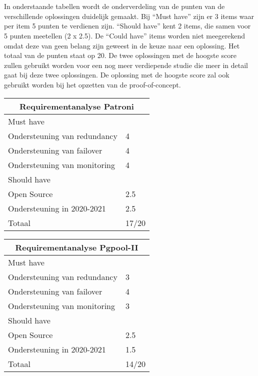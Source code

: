\section{}
\label{sec:Resultatenanalyse}

\subsection{}
\label{subsec:Resultaten requirements}

In onderstaande tabellen wordt de onderverdeling van de punten van de verschillende oplossingen duidelijk gemaakt. Bij “Must have” zijn er 3 items waar per item 5 punten te verdienen zijn. “Should have” kent 2 items, die samen voor 5 punten meetellen (2 x 2.5). De “Could have” items worden niet meegerekend omdat deze van geen belang zijn geweest in de keuze naar een oplossing. Het totaal van de punten staat op 20. De twee oplossingen met de hoogste score zullen gebruikt worden voor een nog meer verdiepende studie die meer in detail gaat bij deze twee oplossingen. De oplossing met de hoogste score zal ook gebruikt worden bij het opzetten van de proof-of-concept.

\begin{tabular}{ |p{6cm}||p{6cm}|  }
    \hline
    \multicolumn{2}{|c|}{Requirementanalyse Patroni} \\
    \hline
    Must have & \\
    \hline
    Ondersteuning van redundancy  & 4 \\
    Ondersteuning van failover &  4 \\
    Ondersteuning van monitoring & 4 \\
    \hline
    Should have & \\
    \hline
   Open Source &  2.5 \\
   Ondersteuning in 2020-2021 & 2.5 \\
    \hline
    \hline
    Totaal & 17/20 \\
    \hline
\end{tabular}


\caption[Tabel 1: Requirementanalyse Patroni]
\newline

\begin{tabular}{ |p{6cm}||p{6cm}|  }
    \hline
    \multicolumn{2}{|c|}{Requirementanalyse Pgpool-II} \\
    \hline
    Must have & \\
    \hline
    Ondersteuning van redundancy  & 3 \\
    Ondersteuning van failover &  4 \\
    Ondersteuning van monitoring & 3 \\
    \hline
    Should have & \\
    \hline
    Open Source &  2.5 \\
    Ondersteuning in 2020-2021 & 1.5 \\
    \hline
    \hline
    Totaal & 14/20 \\
    \hline
\end{tabular}


